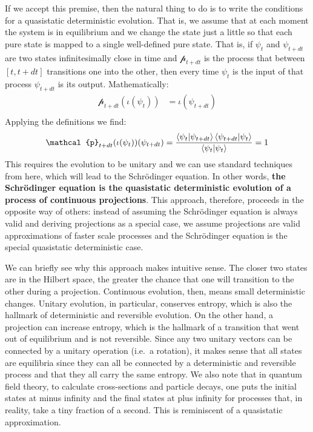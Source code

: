 \documentclass[applsci,article,submit,moreauthors,pdftex]{Definitions/mdpi}
\begin{document}
If we accept this premise, then the natural thing to do is to write the conditions for a quasistatic deterministic evolution. That is, we assume that at each moment the system is in equilibrium and we change the state just a little so that each pure state is mapped to a single well-defined pure state. That is, if $\psi_{t}$ and $\psi_{t+dt}$ are two states infinitesimally close in time and $\mathcal{p}_{t+dt}$ is the process that between $[t, t+dt]$ transitions one into the other, then every time $\psi_{t}$ is the input of that process $\psi_{t+dt}$ is its output. Mathematically:
\begin{equation}
\begin{aligned}
\mathcal{p}_{t+dt}(\iota(\psi_{t}))&=\iota(\psi_{t+dt}) \\
\end{aligned}
\end{equation}
Applying the definitions we find:
\begin{equation}
\begin{aligned}
\mathcal{p}_{t+dt}(\iota(\psi_{t}))(\psi_{t+dt}) &=
\frac{\braket{\psi_{t} | \psi_{t+dt}} \braket{\psi_{t+dt}|\psi_{t}}}{\braket{\psi_{t}|\psi_{t}}} = 1 \\
\end{aligned}
\end{equation}
This requires the evolution to be unitary and we can use standard techniques from here, which will lead to the Schr\"{o}dinger equation. In other words, \textbf{the Schr\"{o}dinger equation is the quasistatic deterministic evolution of a process of continuous projections}. This approach, therefore, proceeds in the opposite way of others: instead of assuming the Schr\"{o}dinger equation is always valid and deriving projections as a special case, we assume projections are valid approximations of faster scale processes and the Schr\"{o}dinger equation is the special quasistatic deterministic case.

We can briefly see why this approach makes intuitive sense. The closer two states are in the Hilbert space, the greater the chance that one will transition to the other during a projection. Continuous evolution, then, means small deterministic changes. Unitary evolution, in particular, conserves entropy, which is also the hallmark of deterministic and reversible evolution. On the other hand, a projection can increase entropy, which is the hallmark of a transition that went out of equilibrium and is not reversible. Since any two unitary vectors can be connected by a unitary operation (i.e.~a rotation), it makes sense that all states are equilibria since they can all be connected by a deterministic and reversible process and that they all carry the same entropy. We also note that in quantum field theory, to calculate cross-sections and particle decays, one puts the initial states at minus infinity and the final states at plus infinity for processes that, in reality, take a tiny fraction of a second. This is reminiscent of a quasistatic approximation.
\end{document}

